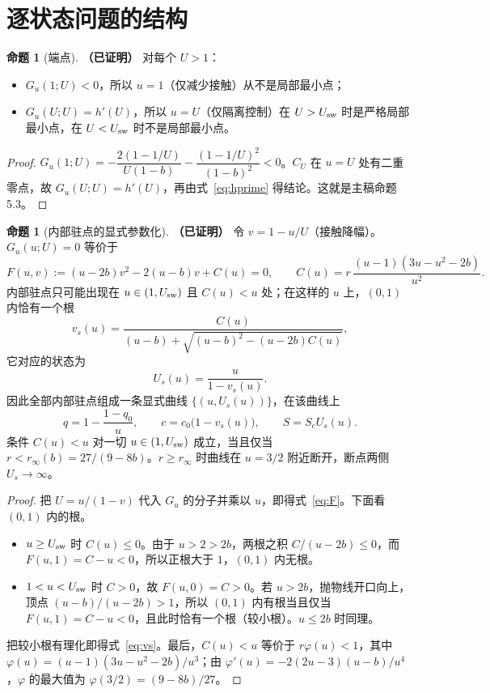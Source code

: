 \documentclass[11pt,a4paper]{ctexart}
\theoremstyle{definition}
\newtheorem{proposition}[theorem]{命题}
\theoremstyle{definition}
\newcommand{\Usw}{U_{\rm sw}}
\newcommand{\rinf}{r_{\infty}}
\newcommand{\proven}{\textbf{（已证明）}}
\begin{document}
\section{逐状态问题的结构}
\label{sec:pointwise}

\begin{proposition}[端点]\label{prop:endpoints}\proven
对每个 $U>1$：
\begin{itemize}
\item $G_u(1;U)<0$，所以 $u=1$（仅减少接触）从不是局部最小点；
\item $G_u(U;U)=h'(U)$，所以 $u=U$（仅隔离控制）在 $U>\Usw$ 时是严格局部最小点，在 $U<\Usw$ 时不是局部最小点。
\end{itemize}
\end{proposition}
\begin{proof}
$G_u(1;U)=-\dfrac{2(1-1/U)}{U(1-b)}-\dfrac{(1-1/U)^2}{(1-b)^2}<0$。$C_U$ 在 $u=U$ 处有二重零点，故 $G_u(U;U)=h'(U)$，再由式~\eqref{eq:hprime} 得结论。这就是主稿命题 5.3。
\end{proof}

\begin{proposition}[内部驻点的显式参数化]\label{prop:branch}\proven
令 $v=1-u/U$（接触降幅）。$G_u(u;U)=0$ 等价于
\begin{equation}
F(u,v):=(u-2b)v^2-2(u-b)v+C(u)=0,\qquad C(u)=r\,\frac{(u-1)(3u-u^2-2b)}{u^2}.
\label{eq:F}
\end{equation}
内部驻点只可能出现在 $u\in(1,\Usw)$ 且 $C(u)<u$ 处；在这样的 $u$ 上，$(0,1)$ 内恰有一个根
\begin{equation}
v_s(u)=\frac{C(u)}{(u-b)+\sqrt{(u-b)^2-(u-2b)C(u)}},
\label{eq:vs}
\end{equation}
它对应的状态为
\[
U_s(u)=\frac{u}{1-v_s(u)} .
\]
因此全部内部驻点组成一条显式曲线 $\{(u,U_s(u))\}$，在该曲线上
\[
q=1-\frac{1-q_0}{u},\qquad c=c_0\bigl(1-v_s(u)\bigr),\qquad S=S_cU_s(u).
\]
条件 $C(u)<u$ 对一切 $u\in(1,\Usw)$ 成立，当且仅当 $r<\rinf(b)=27/(9-8b)$。$r\ge\rinf$ 时曲线在 $u=3/2$ 附近断开，断点两侧 $U_s\to\infty$。
\end{proposition}
\begin{proof}
把 $U=u/(1-v)$ 代入 $G_u$ 的分子并乘以 $u$，即得式~\eqref{eq:F}。下面看 $(0,1)$ 内的根。
\begin{itemize}
\item $u\ge\Usw$ 时 $C(u)\le0$。由于 $u>2>2b$，两根之积 $C/(u-2b)\le0$，而 $F(u,1)=C-u<0$，所以正根大于 $1$，$(0,1)$ 内无根。
\item $1<u<\Usw$ 时 $C>0$，故 $F(u,0)=C>0$。若 $u>2b$，抛物线开口向上，顶点 $(u-b)/(u-2b)>1$，所以 $(0,1)$ 内有根当且仅当 $F(u,1)=C-u<0$，且此时恰有一个根（较小根）。$u\le2b$ 时同理。
\end{itemize}
把较小根有理化即得式~\eqref{eq:vs}。最后，$C(u)<u$ 等价于 $r\varphi(u)<1$，其中 $\varphi(u)=(u-1)(3u-u^2-2b)/u^3$；由 $\varphi'(u)=-2(2u-3)(u-b)/u^4$，$\varphi$ 的最大值为 $\varphi(3/2)=(9-8b)/27$。
\end{proof}
\end{document}
